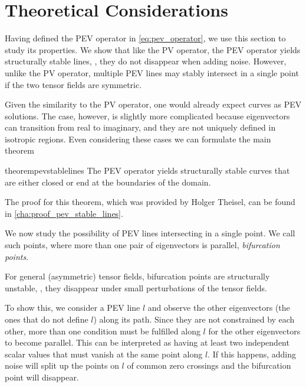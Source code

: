\section{Theoretical Considerations} %
\label{sec:pev_theory}
%
Having defined the \ac{PEV} operator in \cref{eq:pev_operator}, we use this
section to study its properties.
%
We show that like the \ac{PV} operator, the \ac{PEV} operator yields
structurally stable lines, \ie{}, they do not disappear when adding noise.
%
However, unlike the \ac{PV} operator, multiple \ac{PEV} lines may stably
intersect in a single point if the two tensor fields are symmetric.
% 

%
Given the similarity to the \ac{PV} operator, one would already expect curves as
\ac{PEV} solutions.
%
The case, however, is slightly more complicated because eigenvectors can
transition from real to imaginary, and they are not uniquely defined in
isotropic regions.
%
Even considering these cases we can formulate the main theorem
%
\begin{restatable}{theorem}{pevstablelines}
    \label{thm:pev_stable_lines}%
    The \ac{PEV} operator yields structurally stable curves that are either
    closed or end at the boundaries of the domain.
\end{restatable}
%
The proof for this theorem, which was provided by Holger Theisel, can be found
in \cref{cha:proof_pev_stable_lines}.
%

%
We now study the possibility of \ac{PEV} lines intersecting in a single point.
%
We call such points, where more than one pair of eigenvectors is parallel,
\emph{bifurcation points}.
%
\begin{theorem}\label{pev_bifurcation_unstable}
    For general (asymmetric) tensor fields, bifurcation points are structurally
    unstable, \ie{}, they disappear under small perturbations of the tensor
    fields.
\end{theorem}
%
To show this, we consider a \ac{PEV} line $l$ and observe the other eigenvectors
(the ones that do not define $l$) along its path.
%
Since they are not constrained by each other, more than one condition must be
fulfilled along $l$ for the other eigenvectors to become parallel.
%
This can be interpreted as having at least two independent scalar values that
must vanish at the same point along $l$.
%
If this happens, adding noise will split up the points on $l$ of common zero
crossings and the bifurcation point will disappear.
%

